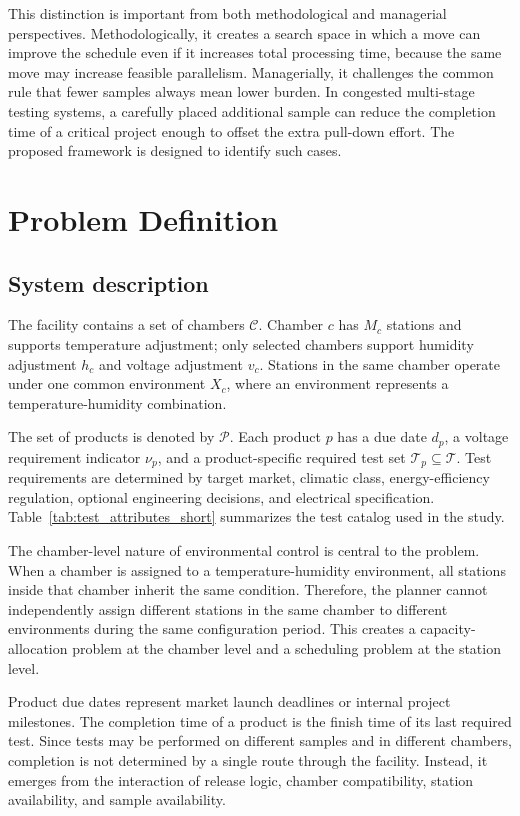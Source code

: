 \documentclass[11pt]{article}
\begin{document}
This distinction is important from both methodological and managerial perspectives. Methodologically, it creates a search space in which a move can improve the schedule even if it increases total processing time, because the same move may increase feasible parallelism. Managerially, it challenges the common rule that fewer samples always mean lower burden. In congested multi-stage testing systems, a carefully placed additional sample can reduce the completion time of a critical project enough to offset the extra pull-down effort. The proposed framework is designed to identify such cases.

\section{Problem Definition}
\label{sec:pd}

\subsection{System description}
\label{subsec:system}

The facility contains a set of chambers \(\mathcal{C}\). Chamber \(c\) has \(M_c\) stations and supports temperature adjustment; only selected chambers support humidity adjustment \(h_c\) and voltage adjustment \(v_c\). Stations in the same chamber operate under one common environment \(X_c\), where an environment represents a temperature-humidity combination.

The set of products is denoted by \(\mathcal{P}\). Each product \(p\) has a due date \(d_p\), a voltage requirement indicator \(\nu_p\), and a product-specific required test set \(\mathcal{T}_p \subseteq \mathcal{T}\). Test requirements are determined by target market, climatic class, energy-efficiency regulation, optional engineering decisions, and electrical specification. Table~\ref{tab:test_attributes_short} summarizes the test catalog used in the study.

The chamber-level nature of environmental control is central to the problem. When a chamber is assigned to a temperature-humidity environment, all stations inside that chamber inherit the same condition. Therefore, the planner cannot independently assign different stations in the same chamber to different environments during the same configuration period. This creates a capacity-allocation problem at the chamber level and a scheduling problem at the station level.

Product due dates represent market launch deadlines or internal project milestones. The completion time of a product is the finish time of its last required test. Since tests may be performed on different samples and in different chambers, completion is not determined by a single route through the facility. Instead, it emerges from the interaction of release logic, chamber compatibility, station availability, and sample availability.
\end{document}
